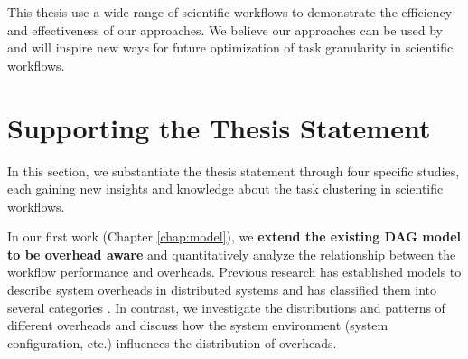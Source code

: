 This thesis use a wide range of scientific workflows to demonstrate the efficiency and effectiveness of our approaches. 
We believe our approaches can be used by and will inspire new ways for future optimization of task granularity in scientific workflows. 



\section{Supporting the Thesis Statement}

In this section, we substantiate the thesis statement through four specific studies, each gaining new insights and knowledge about the task clustering in scientific workflows. 

In our first work \cite{Chen2011} (Chapter \ref{chap:model}), we \textbf{extend the existing DAG model to be overhead aware} and quantitatively analyze the relationship between the workflow performance and overheads. Previous research has established models to describe system overheads in distributed systems and has classified them into several categories \cite{Prodan2007, Prodan2008}. In contrast, we investigate the distributions and patterns of different overheads and discuss how the system environment (system configuration, etc.) influences the distribution of overheads. 

